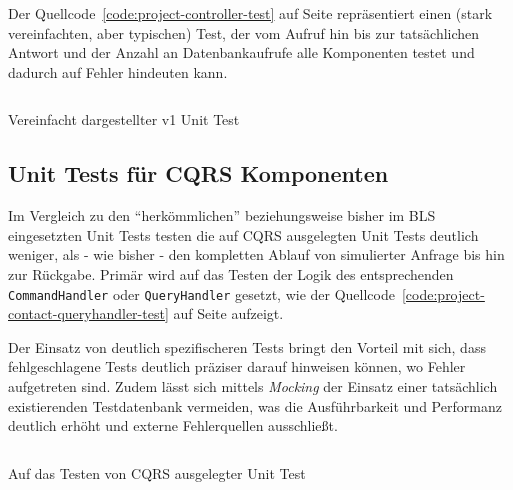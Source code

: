 \documentclass[a4paper,12pt,twoside]{scrreprt}
\begin{document}
Der Quellcode~\ref{code:project-controller-test} auf Seite \pageref{code:project-controller-test} repräsentiert einen (stark vereinfachten, aber typischen) Test, der vom Aufruf hin bis zur tatsächlichen Antwort und der Anzahl an Datenbankaufrufe alle Komponenten testet und dadurch auf Fehler hindeuten kann.

\begin{listing}[ht]
    \inputminted[fontsize=\footnotesize,linenos,breaklines]{php}{code/project_controller_test.php}
    \caption[Vereinfacht dargestellter v1 Unit Test]{Vereinfacht dargestellter v1 Unit Test}
    \label{code:project-controller-test}
\end{listing}

\subsection{Unit Tests für CQRS Komponenten}
\label{sub-sec:v2-unit-tests}
Im Vergleich zu den \enquote{herkömmlichen} beziehungsweise bisher im BLS eingesetzten Unit Tests testen die auf CQRS ausgelegten Unit Tests deutlich weniger, als - wie bisher - den kompletten Ablauf von simulierter Anfrage bis hin zur Rückgabe. Primär wird auf das Testen der Logik des entsprechenden \texttt{CommandHandler} oder \texttt{QueryHandler} gesetzt, wie der Quellcode~\ref{code:project-contact-queryhandler-test} auf Seite \pageref{code:project-contact-queryhandler-test} aufzeigt.

\medskip

Der Einsatz von deutlich spezifischeren Tests bringt den Vorteil mit sich, dass fehlgeschlagene Tests deutlich präziser darauf hinweisen können, wo Fehler aufgetreten sind. Zudem lässt sich mittels \textit{Mocking} der Einsatz einer tatsächlich existierenden Testdatenbank vermeiden, was die Ausführbarkeit und Performanz deutlich erhöht und externe Fehlerquellen ausschließt.

\begin{listing}[ht]
    \inputminted[fontsize=\footnotesize,linenos,breaklines]{php}{code/project_contact_queryhandler_test.php}
    \caption[Auf das Testen von CQRS ausgelegter Unit Test]{Auf das Testen von CQRS ausgelegter Unit Test}
    \label{code:project-contact-queryhandler-test}
\end{listing}

\clearpage

\clearpage
{}
{}
\printbibliography
\end{document}
